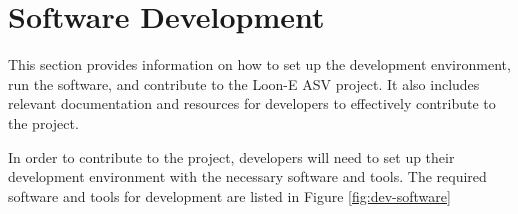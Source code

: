%
%
%
%

\section{Software Development}
\label{sec:software-development}
This section provides information on how to set up the development environment, run the software, and contribute to the Loon-E ASV project.
It also includes relevant documentation and resources for developers to effectively contribute to the project.

In order to contribute to the project, developers will need to set up their development environment with the necessary software and tools.
The required software and tools for development are listed in Figure \ref{fig:dev-software}

